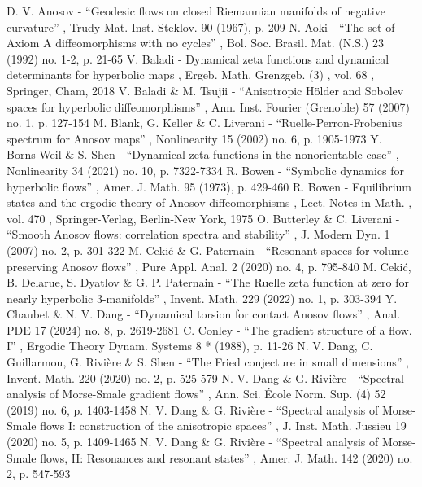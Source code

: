  D. V. Anosov - “Geodesic flows on closed Riemannian manifolds of negative curvature” , Trudy Mat. Inst. Steklov. 90 (1967), p. 209
 N. Aoki - “The set of Axiom A diffeomorphisms with no cycles” , Bol. Soc. Brasil. Mat. (N.S.) 23 (1992) no. 1-2, p. 21-65
 V. Baladi - Dynamical zeta functions and dynamical determinants for hyperbolic maps , Ergeb. Math. Grenzgeb. (3) , vol. 68 , Springer, Cham, 2018
 V. Baladi \& M. Tsujii - “Anisotropic Hölder and Sobolev spaces for hyperbolic diffeomorphisms” , Ann. Inst. Fourier (Grenoble) 57 (2007) no. 1, p. 127-154
 M. Blank, G. Keller \& C. Liverani - “Ruelle-Perron-Frobenius spectrum for Anosov maps” , Nonlinearity 15 (2002) no. 6, p. 1905-1973
 Y. Borns-Weil \& S. Shen - “Dynamical zeta functions in the nonorientable case” , Nonlinearity 34 (2021) no. 10, p. 7322-7334
 R. Bowen - “Symbolic dynamics for hyperbolic flows” , Amer. J. Math. 95 (1973), p. 429-460
 R. Bowen - Equilibrium states and the ergodic theory of Anosov diffeomorphisms , Lect. Notes in Math. , vol. 470 , Springer-Verlag, Berlin-New York, 1975
 O. Butterley \& C. Liverani - “Smooth Anosov flows: correlation spectra and stability” , J. Modern Dyn. 1 (2007) no. 2, p. 301-322
 M. Cekić \& G. Paternain - “Resonant spaces for volume-preserving Anosov flows” , Pure Appl. Anal. 2 (2020) no. 4, p. 795-840
 M. Cekić, B. Delarue, S. Dyatlov \& G. P. Paternain - “The Ruelle zeta function at zero for nearly hyperbolic 3-manifolds” , Invent. Math. 229 (2022) no. 1, p. 303-394
 Y. Chaubet \& N. V. Dang - “Dynamical torsion for contact Anosov flows” , Anal. PDE 17 (2024) no. 8, p. 2619-2681
 C. Conley - “The gradient structure of a flow. I” , Ergodic Theory Dynam. Systems 8 * (1988), p. 11-26
 N. V. Dang, C. Guillarmou, G. Rivière \& S. Shen - “The Fried conjecture in small dimensions” , Invent. Math. 220 (2020) no. 2, p. 525-579
 N. V. Dang \& G. Rivière - “Spectral analysis of Morse-Smale gradient flows” , Ann. Sci. École Norm. Sup. (4) 52 (2019) no. 6, p. 1403-1458
 N. V. Dang \& G. Rivière - “Spectral analysis of Morse-Smale flows I: construction of the anisotropic spaces” , J. Inst. Math. Jussieu 19 (2020) no. 5, p. 1409-1465
 N. V. Dang \& G. Rivière - “Spectral analysis of Morse-Smale flows, II: Resonances and resonant states” , Amer. J. Math. 142 (2020) no. 2, p. 547-593

